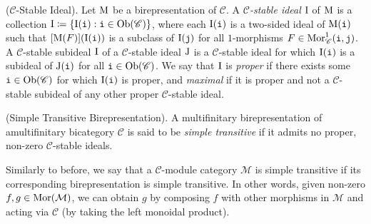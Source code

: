 \noindent\begin{definition}\textup{($\mathscr{C}$-Stable Ideal).} Let $\textup{M}$ be a birepresentation of $\mathscr{C}$. A %
{\em $\mathscr{C}$-stable ideal} $\textup{I}$ of $\textup{M}$ is a collection $\textup{I} \coloneqq \{\textup{I}(\textnormal{\texttt{i}}) : \textnormal{\texttt{i}} \in \textnormal{Ob}(\mathscr{C})\}$, where each $\textup{I}(\textnormal{\texttt{i}})$ is a %
two-sided ideal of $\textup{M}(\textnormal{\texttt{i}})$ such that $[\textup{M}(F)](\textup{I}(\textnormal{\texttt{i}}))$ is a subclass of $\textup{I}(\textnormal{\texttt{j}})$ for all $1$-morphisms $F \in \textnormal{Mor}_\mathscr{C}^1(\textnormal{\texttt{i}}, \textnormal{\texttt{j}})$. %
A $\mathscr{C}$-stable subideal $\textup{I}$ of a $\mathscr{C}$-stable ideal $\textup{J}$ is a $\mathscr{C}$-stable ideal for which $\textup{I}(\textnormal{\texttt{i}})$ is a subideal of $\textup{J}(\textnormal{\texttt{i}})$ for all $\textnormal{\texttt{i}} \in \textnormal{Ob}(\mathscr{C})$. We say that $\textup{I}$ is {\em proper} if there exists some $\textnormal{\texttt{i}} \in \textnormal{Ob}(\mathscr{C})$ for which $\textup{I}(\textnormal{\texttt{i}})$ is proper, and {\em maximal} if it is proper and not a $\mathscr{C}$-stable subideal of any other proper $\mathscr{C}$-stable ideal.\\
\end{definition}

\noindent\begin{definition}\textup{(Simple Transitive Birepresentation).} %
A multifinitary birepresentation of a\linebreak multifinitary bicategory $\mathscr{C}$ is said to be {\em simple transitive} if it admits no proper, non-zero $\mathscr{C}$-stable ideals.\\
\end{definition}

\noindent Similarly to before, we say that a $\mathcal{C}$-module category $\mathcal{M}$ is simple transitive if its corresponding birepresentation is simple transitive. In other words, given non-zero $f, g \in \textnormal{Mor}(\mathcal{M})$, we can obtain $g$ by composing $f$ with other morphisms in $\mathcal{M}$ and acting via $\mathcal{C}$ (by taking the left monoidal product).\\%

